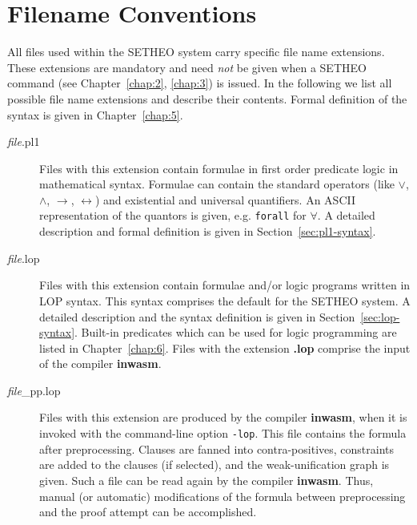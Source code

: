%
\section{Filename Conventions}

All files used within the SETHEO system carry specific file name
extensions. These extensions are mandatory and need {\em not} be given
when a SETHEO command (see Chapter~\ref{chap:2}, \ref{chap:3})
is issued.
In the following we list all possible file name extensions and describe
their contents. Formal definition of the syntax is given in 
Chapter~\ref{chap:5}.

\begin{description}
\item[{\em file}.pl1]
Files with this extension contain formulae in first order predicate
logic in mathematical syntax. Formulae can contain the standard
operators (like $\vee$, $\wedge$, $\rightarrow$, $\leftrightarrow$) and
existential and universal quantifiers. An ASCII representation
of the quantors is given, e.g. {\tt forall} for $\forall$.
A detailed description and formal definition is given in
Section~\ref{sec:pl1-syntax}.


\item[{\em file}.lop]
Files with this extension contain formulae and/or logic programs
written in LOP syntax. This syntax comprises the default for the
SETHEO system.
A detailed description and the syntax definition is given in
Section~\ref{sec:lop-syntax}. Built-in predicates which can be used
for logic programming are listed in Chapter~\ref{chap:6}.
Files with the extension {\bf .lop} comprise the input of the compiler
{\bf inwasm}.

\item[{\em file}\_pp.lop]
Files with this extension are produced by the compiler {\bf inwasm},
when it is invoked with the command-line option {\tt -lop}.
This file contains the formula after preprocessing. Clauses are fanned
into contra-positives, constraints are added to the clauses
(if selected), and the weak-unification graph is given.
Such a file can be read again by the compiler {\bf inwasm}.
Thus, manual (or automatic) modifications of the formula between
preprocessing and the proof attempt can be accomplished.


\end{description}
